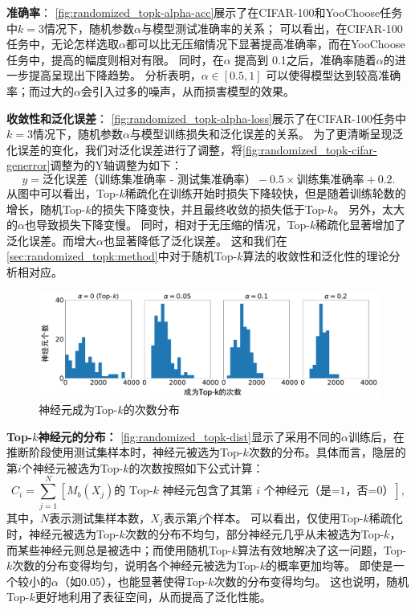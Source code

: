 \textbf{准确率}：
\autoref{fig:randomized_topk-alpha-acc}展示了在CIFAR-100和YooChoose任务中$k=3$情况下，随机参数$\alpha$与模型测试准确率的关系；
可以看出，在CIFAR-100任务中，无论怎样选取$\alpha$都可以比无压缩情况下显著提高准确率，而在YooChoose任务中，提高的幅度则相对有限。
同时，在$\alpha$ 提高到 0.1之后，准确率随着$\alpha$的进一步提高呈现出下降趋势。
%
分析表明，$\alpha \in [0.5, 1]$ 可以使得模型达到较高准确率；而过大的$\alpha$会引入过多的噪声，从而损害模型的效果。


\textbf{收敛性和泛化误差}：
\autoref{fig:randomized_topk-alpha-loss}展示了在CIFAR-100任务中$k=3$情况下，随机参数$\alpha$与模型训练损失和泛化误差的关系。
为了更清晰呈现泛化误差的变化，我们对泛化误差进行了调整，将\autoref{fig:randomized_topk-cifar-generror}调整为的Y轴调整为如下：
\begin{equation}
    y = \text{泛化误差（训练集准确率 - 测试集准确率）} - 0.5 \times \text{训练集准确率} + 0.2.
\end{equation}
%
从图中可以看出，Top-$k$稀疏化在训练开始时损失下降较快，但是随着训练轮数的增长，随机Top-$k$的损失下降变快，并且最终收敛的损失低于Top-$k$。
另外，太大的$\alpha$也导致损失下降变慢。
%
同时，相对于无压缩的情况，Top-$k$稀疏化显著增加了泛化误差。而增大$\alpha$也显著降低了泛化误差。
%
这和我们在\autoref{sec:randomized_topk:method}中对于随机Top-$k$算法的收敛性和泛化性的理论分析相对应。



\begin{figure}[h!]
    \centering
    \includegraphics[width=\linewidth]{Z_Resources/随机topk_cifar100-dist-topk.pdf}
    \caption{神经元成为Top-$k$的次数分布}
    \label{fig:randomized_topk-dist}
\end{figure}

\textbf{Top-$k$神经元的分布：}
\autoref{fig:randomized_topk-dist}显示了采用不同的$\alpha$训练后，在推断阶段使用测试集样本时，神经元被选为Top-$k$次数的分布。具体而言，隐层的第$i$个神经元被选为Top-$k$的次数按照如下公式计算：
\begin{equation}
    C_i = \sum_{j=1}^N [\text{$M_b(X_j)$的 Top-$k$ 神经元包含了其第 $i$ 个神经元（是=1，否=0）}],
\end{equation}
其中，$N$表示测试集样本数，$X_j$表示第$j$个样本。
%
%
可以看出，仅使用Top-$k$稀疏化时，神经元被选为Top-$k$次数的分布不均匀，部分神经元几乎从未被选为Top-$k$，而某些神经元则总是被选中；而使用随机Top-$k$算法有效地解决了这一问题，Top-$k$次数的分布变得均匀，说明各个神经元被选为Top-$k$的概率更加均等。
%
即使是一个较小的$\alpha$（如0.05），也能显著使得Top-$k$次数的分布变得均匀。
%
这也说明，随机Top-$k$更好地利用了表征空间，从而提高了泛化性能。
%



